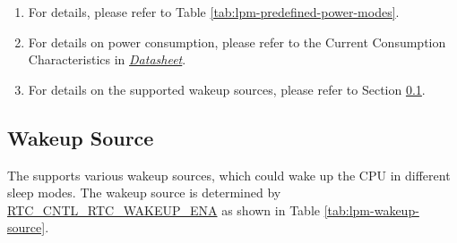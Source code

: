 \documentclass[main\_\_EN.tex]{subfiles}
\begin{document}
\begin{tiplisting}
\vspace{-2em}
\label{other:lpm-predefined-modes-notes}
\begin{enumerate}
    \item For details, please refer to Table \ref{tab:lpm-predefined-power-modes}.
    \item For details on power consumption, please refer to the Current Consumption Characteristics in \href{https://www.espressif.com/sites/default/files/documentation/\chipname{}_datasheet_en.pdf}{\it{\chipname{} Datasheet}}.
    \item For details on the supported wakeup sources, please refer to Section \ref{sec:lpm-wakeup-source}.
\end{enumerate}
\end{tiplisting}


\subsection{Wakeup Source}\label{sec:lpm-wakeup-source}

The \chipname{} supports various wakeup sources, which could wake up the CPU in different sleep modes. The wakeup source is determined by \hyperref[fielddesc:RTCCNTLRTCWAKEUPENA]{RTC\_CNTL\_RTC\_WAKEUP\_ENA} as shown in Table \ref{tab:lpm-wakeup-source}.
\end{document}
